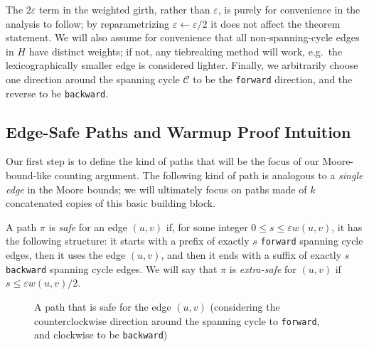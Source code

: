 \documentclass{article}\usepackage[a4paper,margin=20mm]{geometry}
\newcommand{\eps}{\varepsilon}
\newcommand{\cee}{\mathcal{C}}
\newcommand{\forward}{\texttt{forward}}
\newcommand{\backward}{\texttt{backward}}
\begin{document}
The $2\eps$ term in the weighted girth, rather than $\eps$, is purely for convenience in the analysis to follow; by reparametrizing $\eps \gets \eps/2$ it does not affect the theorem statement.
We will also assume for convenience that all non-spanning-cycle edges in $H$ have distinct weights; if not, any tiebreaking method will work, e.g.\ the lexicographically smaller edge is considered lighter.
Finally, we arbitrarily choose one direction around the spanning cycle $\cee$ to be the \forward{} direction, and the reverse to be \backward{}.

\subsection{Edge-Safe Paths and Warmup Proof Intuition}

Our first step is to define the kind of paths that will be the focus of our Moore-bound-like counting argument.
The following kind of path is analogous to a \emph{single edge} in the Moore bounds; we will ultimately focus on paths made of $k$ concatenated copies of this basic building block.

\begin{definition} 
A path $\pi$ is \emph{safe} for an edge $(u, v)$ if, for some integer $0 \le s \le \eps w(u, v)$, it has the following structure: it starts with a prefix of exactly $s$ \forward{} spanning cycle edges, then it uses the edge $(u, v)$, and then it ends with a suffix of exactly $s$ \backward{} spanning cycle edges.
We will say that $\pi$ is \emph{extra-safe} for $(u, v)$ if $s \le \eps w(u, v)/2$.
\end{definition}

\begin{figure}[h]
\begin{center}
\end{center}
\caption{A path that is safe for the edge $(u, v)$ (considering the counterclockwise direction around the spanning cycle to \forward{}, and clockwise to be \backward{})}
\end{figure}
\end{document}
